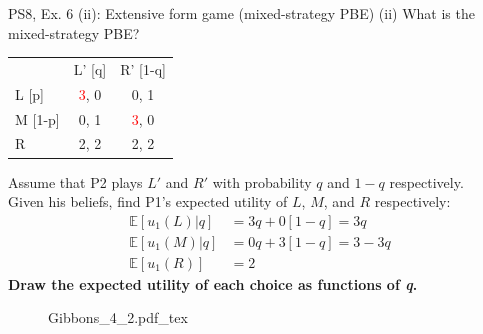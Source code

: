 \begin{frame}{PS8, Ex. 6 (ii): Extensive form game (mixed-strategy PBE)}
    (ii) What is the mixed-strategy PBE? \vspace{-8pt}
    \begin{multicols}{2}
      \begin{table}
        \begin{tabular}{l|c|c|}
          \multicolumn{1}{c}{} & \multicolumn{1}{c}{L' [q]} & \multicolumn{1}{c}{R' [1-q]} \\\cline{2-3}
          L [p]   & \textcolor{red}{3}, 0 & 0, \color{blue}1 \\\cline{2-3}
          M [1-p] & 0, \color{blue}1 & \textcolor{red}{3}, 0 \\\cline{2-3}
          R       & 2, \color{blue}2 & 2, \color{blue}2 \\\cline{2-3}
        \end{tabular}
      \end{table} \vspace{-4pt}
      Assume that P2 plays $L'$ and $R'$ with probability $q$ and $1-q$ respectively.\\\smallskip
      Given his beliefs, find P1's expected utility of $L$, $M$, and $R$ respectively: \vspace{-4pt}
      \begin{align*}
        \mathbb{E}[u_1(L)|q]&=3q+0[1-q]=3q\\
        \mathbb{E}[u_1(M)|q]&=0q+3[1-q]=3-3q\\
        \mathbb{E}[u_1(R)]&=2
      \end{align*}
      \textbf{Draw the expected utility of each choice as functions of \textit{q}.}
      \vfill\null\columnbreak
      \begin{figure}[!h]
        \center {}
        {Gibbons_4_2.pdf_tex}
      \end{figure}
      \vfill\null
    \end{multicols}
\end{frame}
